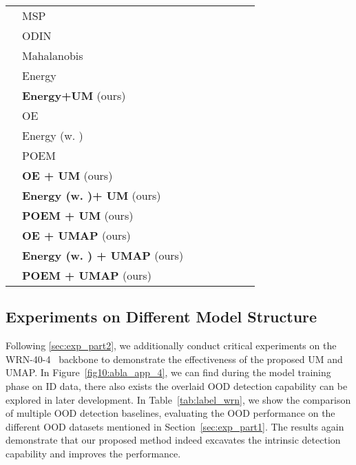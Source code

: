 \documentclass{article}
\theoremstyle{plain}
\theoremstyle{definition}
\theoremstyle{remark}
\begin{document}
\begin{table}[t!]
{\begin{tabular}{c|l|cccccc}
        \cmidrule{2-8}
         & MSP &  &  &  &  &  & \\
         & ODIN &  &  &  &  &  & \\
         & Mahalanobis &  &  &  &  &  & \\
         & Energy &  &  &  &  &  & \\
         & \textbf{Energy+UM} (ours) &  &  &  &  &  & \\
         \cmidrule{2-8}
         & OE &  &  &  &  &  & \\
         & Energy (w. ) &  &  &  &  &  & \\
         & POEM &  &  &  &  &  & \\
         & \textbf{OE + UM} (ours) &  &  &  &  &  & \\
         & \textbf{Energy (w. )+ UM} (ours) &  &  &  &  &  & \\
         & \textbf{POEM + UM} (ours) &  &  &  &  &  & \\
         & \textbf{OE + UMAP} (ours) &  &  &  &  &  & \\
         & \textbf{Energy (w. ) + UMAP} (ours) &  &  &  &  &  & \\
         & \textbf{POEM + UMAP} (ours) &  &  &  &  &  & \\
        \bottomrule[1.5pt]
    \end{tabular}}
    \label{tab:my_label4}
\end{table}


\subsection{Experiments on Different Model Structure}
\label{app:exp_diff_model}


Following \ref{sec:exp_part2}, we additionally conduct critical experiments on the WRN-40-4~\citep{lin2021mood} backbone to demonstrate the effectiveness of the proposed UM and UMAP. In Figure~\ref{fig10:abla_app_4}, we can find during the model training phase on ID data, there also exists the overlaid OOD detection capability can be explored in later development. In Table~\ref{tab:label_wrn}, we show the comparison of multiple OOD detection baselines, evaluating the OOD performance on the different OOD datasets mentioned in Section~\ref{sec:exp_part1}. The results again demonstrate that our proposed method indeed excavates the intrinsic detection capability and improves the performance. 
\end{document}
